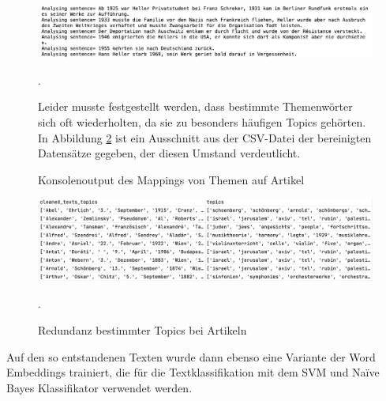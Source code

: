 \documentclass[ngerman]{ttlab-qualify}
\begin{document}
\begin{figure}[H]
\begin{center}
\includegraphics[width=16cm]{grafiken/BERTopic_Satzanalyse.png}
\caption[Konsolenoutput des Mappings von Themen auf Artikel]{Konsolenoutput des Mappings von Themen auf Artikel}.
\label{satzanalyse}
\end{center}
Leider musste festgestellt werden, dass bestimmte Themenwörter sich oft wiederholten, da sie zu besonders häufigen Topics gehörten. In Abbildung \ref{text_topic_dataframe} ist ein Ausschnitt aus der CSV-Datei der bereinigten Datensätze gegeben, der diesen Umstand verdeutlicht. 
\end{figure} 
\begin{figure}[H]
\begin{center}
\includegraphics[width=16cm]{grafiken/text_topic_mapping.png}
\caption[Redundanz bestimmter Topics bei Artikeln]{Redundanz bestimmter Topics bei Artikeln}.
\label{text_topic_dataframe}
\end{center}
\end{figure} 
\noindent Auf den so entstandenen Texten wurde dann ebenso eine Variante der Word Embeddings trainiert, die für die Textklassifikation mit dem SVM und Naïve Bayes Klassifikator verwendet werden. 
\end{document}

